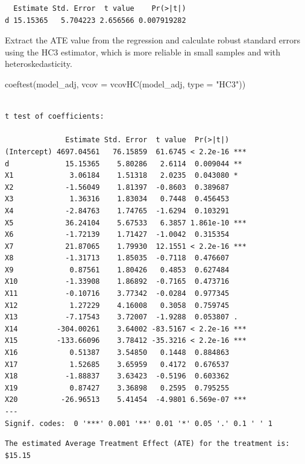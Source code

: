 \documentclass[
  letterpaper,
  DIV=11,
  numbers=noendperiod]{scrartcl}
\newenvironment{Shaded}{\begin{snugshade}}{\end{snugshade}}
\newcommand{\AttributeTok}[1]{\textcolor[rgb]{0.40,0.45,0.13}{#1}}
\newcommand{\FunctionTok}[1]{\textcolor[rgb]{0.28,0.35,0.67}{#1}}
\newcommand{\NormalTok}[1]{\textcolor[rgb]{0.00,0.23,0.31}{#1}}
\newcommand{\StringTok}[1]{\textcolor[rgb]{0.13,0.47,0.30}{#1}}
\begin{document}
\begin{verbatim}
  Estimate Std. Error  t value    Pr(>|t|)
d 15.15365   5.704223 2.656566 0.007919282
\end{verbatim}

Extract the ATE value from the regression and calculate robust standard
errors using the HC3 estimator, which is more reliable in small samples
and with heteroskedasticity.

\begin{Shaded}
\begin{Highlighting}[]
\FunctionTok{coeftest}\NormalTok{(model\_adj, }\AttributeTok{vcov =} \FunctionTok{vcovHC}\NormalTok{(model\_adj, }\AttributeTok{type =} \StringTok{"HC3"}\NormalTok{))}
\end{Highlighting}
\end{Shaded}

\begin{verbatim}

t test of coefficients:

              Estimate Std. Error  t value  Pr(>|t|)    
(Intercept) 4697.04561   76.15859  61.6745 < 2.2e-16 ***
d             15.15365    5.80286   2.6114  0.009044 ** 
X1             3.06184    1.51318   2.0235  0.043080 *  
X2            -1.56049    1.81397  -0.8603  0.389687    
X3             1.36316    1.83034   0.7448  0.456453    
X4            -2.84763    1.74765  -1.6294  0.103291    
X5            36.24104    5.67533   6.3857 1.861e-10 ***
X6            -1.72139    1.71427  -1.0042  0.315354    
X7            21.87065    1.79930  12.1551 < 2.2e-16 ***
X8            -1.31713    1.85035  -0.7118  0.476607    
X9             0.87561    1.80426   0.4853  0.627484    
X10           -1.33908    1.86892  -0.7165  0.473716    
X11           -0.10716    3.77342  -0.0284  0.977345    
X12            1.27229    4.16008   0.3058  0.759745    
X13           -7.17543    3.72007  -1.9288  0.053807 .  
X14         -304.00261    3.64002 -83.5167 < 2.2e-16 ***
X15         -133.66096    3.78412 -35.3216 < 2.2e-16 ***
X16            0.51387    3.54850   0.1448  0.884863    
X17            1.52685    3.65959   0.4172  0.676537    
X18           -1.88837    3.63423  -0.5196  0.603362    
X19            0.87427    3.36898   0.2595  0.795255    
X20          -26.96513    5.41454  -4.9801 6.569e-07 ***
---
Signif. codes:  0 '***' 0.001 '**' 0.01 '*' 0.05 '.' 0.1 ' ' 1
\end{verbatim}

\begin{verbatim}
The estimated Average Treatment Effect (ATE) for the treatment is: $15.15
\end{verbatim}
\end{document}
